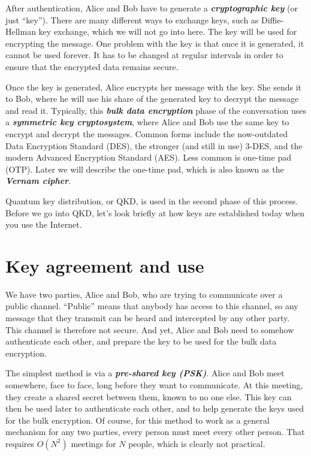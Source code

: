 After authentication, Alice and Bob have to generate a \textbf{\emph{cryptographic key}} (or just ``key'').
There are many different ways to exchange keys, such as Diffie-Hellman key exchange, which we will not go into here.
The key will be used for encrypting the message.
One problem with the key is that once it is generated, it cannot be used forever.
It has to be changed at regular intervals in order to ensure that the encrypted data remains secure.

Once the key is generated, Alice encrypts her message with the key.
She sends it to Bob, where he will use his share of the generated key to decrypt the message and read it. 
Typically, this \textbf{\emph{bulk data encryption}} phase of the conversation uses a \textbf{\emph{symmetric key cryptosystem}}, where Alice and Bob use the same key to encrypt and decrypt the messages.
Common forms include the now-outdated Data Encryption Standard (DES), the stronger (and still in use) 3-DES, and the modern Advanced Encryption Standard (AES). Less common is one-time pad (OTP).
Later we will describe the one-time pad, which is also known as the \textbf{\emph{Vernam cipher}}.

Quantum key distribution, or QKD, is used in the second phase of this process. 
Before we go into QKD, let's look briefly at how keys are established today when you use the Internet.



\section{Key agreement and use}
\label{sec:key_agreement_use}

We have two parties, Alice and Bob, who are trying to communicate over a public channel.
``Public'' means that anybody has access to this channel, so any message that they transmit can be heard and intercepted by any other party.
This channel is therefore not secure.
And yet, Alice and Bob need to somehow authenticate each other, and prepare the key to be used for the bulk data encryption.

The simplest method is via a \textbf{\emph{pre-shared key (PSK)}}.
Alice and Bob meet somewhere, face to face, long before they want to communicate. 
At this meeting, they create a shared secret between them, known to no one else. 
This key can then be used later to authenticate each other, and to help generate the keys used for the bulk encryption. 
Of course, for this method to work as a general mechanism for any two parties, every person must meet every other person. 
That requires $O(N^2)$ meetings for $N$ people, which is clearly not practical.

